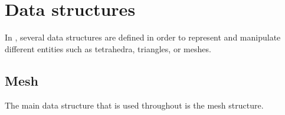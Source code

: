\chapter{Data structures}

In \mmg, several data structures are defined in order to represent and manipulate different entities such as tetrahedra, triangles, or meshes.

\section{Mesh}

The main data structure that is used throughout \mmg is the mesh structure.
